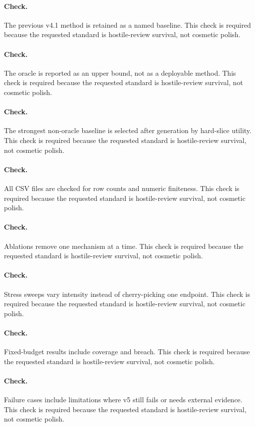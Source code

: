 \documentclass{article}
\begin{document}
\paragraph{Check.} The previous v4.1 method is retained as a named baseline. This check is required because the requested standard is hostile-review survival, not cosmetic polish.
\paragraph{Check.} The oracle is reported as an upper bound, not as a deployable method. This check is required because the requested standard is hostile-review survival, not cosmetic polish.
\paragraph{Check.} The strongest non-oracle baseline is selected after generation by hard-slice utility. This check is required because the requested standard is hostile-review survival, not cosmetic polish.
\paragraph{Check.} All CSV files are checked for row counts and numeric finiteness. This check is required because the requested standard is hostile-review survival, not cosmetic polish.
\paragraph{Check.} Ablations remove one mechanism at a time. This check is required because the requested standard is hostile-review survival, not cosmetic polish.
\paragraph{Check.} Stress sweeps vary intensity instead of cherry-picking one endpoint. This check is required because the requested standard is hostile-review survival, not cosmetic polish.
\paragraph{Check.} Fixed-budget results include coverage and breach. This check is required because the requested standard is hostile-review survival, not cosmetic polish.
\paragraph{Check.} Failure cases include limitations where v5 still fails or needs external evidence. This check is required because the requested standard is hostile-review survival, not cosmetic polish.
\end{document}
